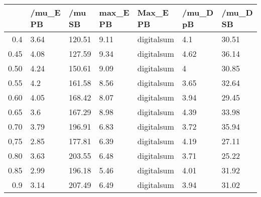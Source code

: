 \begin{table}[ht]
\centering
\begin{tabular}{rllllll}
  \hline
 & /mu\_E PB & /mu SB & max\_E PB & Max\_E PB & /mu\_D pB & /mu\_D SB \\ 
  \hline
0.4 & 3.64 & 120.51 & 9.11 & digitalsum & 4.1 & 30.51 \\ 
  0.45 & 4.08 & 127.59 & 9.34 & digitalsum & 4.62 & 36.14 \\ 
  0.50 & 4.24 & 150.61 & 9.09 & digitalsum & 4 & 30.85 \\ 
  0.55 & 4.2 & 161.58 & 8.56 & digitalsum & 3.65 & 32.64 \\ 
  0.60 & 4.05 & 168.42 & 8.07 & digitalsum & 3.94 & 29.45 \\ 
  0.65 & 3.6 & 167.29 & 8.98 & digitalsum & 4.39 & 33.98 \\ 
  0.70 & 3.79 & 196.91 & 6.83 & digitalsum & 3.72 & 35.94 \\ 
  0,75 & 2.85 & 177.81 & 6.39 & digitalsum & 4.19 & 27.11 \\ 
  0.80 & 3.63 & 203.55 & 6.48 & digitalsum & 3.71 & 25.22 \\ 
  0.85 & 2.99 & 196.18 & 5.46 & digitalsum & 4.01 & 31.92 \\ 
  0.9 & 3.14 & 207.49 & 6.49 & digitalsum & 3.94 & 31.02 \\ 
   \hline
\end{tabular}
\end{table}
